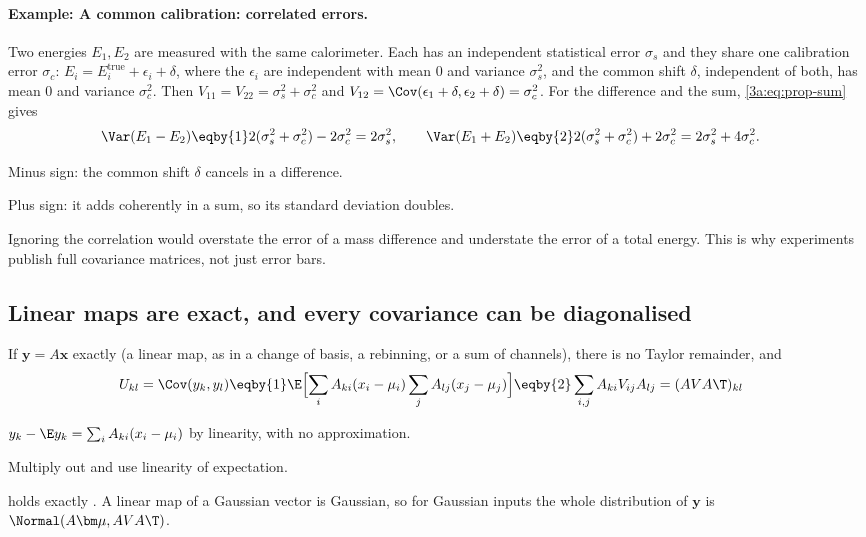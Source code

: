 \paragraph{Example: A common calibration: correlated errors.}
\label{3a:ex:common-calib}
Two energies $E_1,E_2$ are measured with the same calorimeter. Each has an
independent statistical error $\sigma_s$ and they share one calibration error
$\sigma_c$: $E_i=E_i^{\text{true}}+\epsilon_i+\delta$, where the $\epsilon_i$ are
independent with mean $0$ and variance $\sigma_s^2$, and the common shift
$\delta$, independent of both, has mean $0$ and variance $\sigma_c^2$. Then
$V_{11}=V_{22}=\sigma_s^2+\sigma_c^2$ and $V_{12}=\Cov(\epsilon_1+\delta,\epsilon_2+\delta)=\sigma_c^2$.
For the difference and the sum, \eqref{3a:eq:prop-sum} gives
\begin{align*}
  \Var(E_1-E_2) &\eqby{1} 2(\sigma_s^2+\sigma_c^2)-2\sigma_c^2=2\sigma_s^2,\qquad
  \Var(E_1+E_2) \eqby{2} 2(\sigma_s^2+\sigma_c^2)+2\sigma_c^2=2\sigma_s^2+4\sigma_c^2 .
\end{align*}
\begin{explain}
  \item Minus sign: the common shift $\delta$ cancels in a difference.
  \item Plus sign: it adds coherently in a sum, so its standard deviation doubles.
\end{explain}
Ignoring the correlation would overstate the error of a mass difference and
understate the error of a total energy. This is why experiments publish full
covariance matrices, not just error bars.

\subsection{Linear maps are exact, and every covariance can be diagonalised}
\label{3a:sec:linear-exact}

If $\bm y=A\bm x$ exactly (a linear map, as in a change of basis, a
rebinning, or a sum of channels), there is no Taylor remainder, and
\begin{align}
  U_{kl}=\Cov(y_k,y_l)
  &\eqby{1} \E\Bigl[\sum_iA_{ki}(x_i-\mu_i)\sum_jA_{lj}(x_j-\mu_j)\Bigr]
   \eqby{2} \sum_{i,j}A_{ki}V_{ij}A_{lj}
   = (AVA\T)_{kl}
  \label{3a:eq:linear-exact}
\end{align}
\begin{explain}
  \item $y_k-\E y_k=\sum_iA_{ki}(x_i-\mu_i)$ by linearity, with no approximation.
  \item Multiply out and use linearity of expectation.
\end{explain}
holds exactly . A linear map of a Gaussian vector is
Gaussian, so for Gaussian inputs the whole distribution of $\bm y$ is
$\Normal(A\bm\mu,AVA\T)$.


